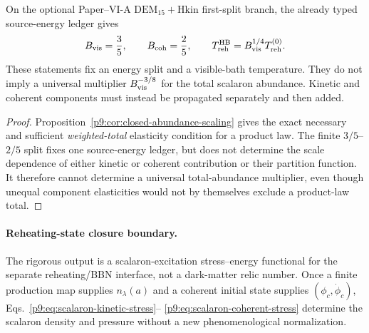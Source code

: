 \documentclass[12pt,a4paper]{article}
\begin{document}
\begin{proposition}
\label{p9:thm:scalaron-readout-coordinate-conversion}
On the optional Paper--VI-A \(\mathrm{DEM}_{15}+\mathrm{Hkin}\) first-split
branch, the already typed source-energy ledger gives
\[
B_{\rm vis}=\frac35,\qquad B_{\rm coh}=\frac25,
\qquad T_{\rm reh}^{\rm HB}=B_{\rm vis}^{1/4}T_{\rm reh}^{(0)}.
\]
These statements fix an energy split and a visible-bath temperature.  They do
not imply a universal multiplier \(B_{\rm vis}^{-3/8}\) for the total scalaron
abundance.  Kinetic and coherent components must instead be propagated
separately and then added.
\end{proposition}

\begin{proof}
Proposition~\ref{p9:cor:closed-abundance-scaling} gives the exact necessary
and sufficient \emph{weighted-total} elasticity condition for a product law.
The finite \(3/5\)--\(2/5\) split fixes one source-energy ledger, but does
not determine the scale dependence of either kinetic or coherent contribution
or their partition function.  It therefore cannot determine a universal
total-abundance multiplier, even though unequal component elasticities would
not by themselves exclude a product-law total.
\end{proof}




\paragraph{Reheating-state closure boundary.}
The rigorous output is a scalaron-excitation stress--energy functional for the
separate reheating/BBN interface, not a dark-matter relic number.  Once a finite
production map supplies \(n_\lambda(a)\) and a coherent initial state supplies
\((\phi_c,\dot\phi_c)\), Eqs.~\eqref{p9:eq:scalaron-kinetic-stress}--
\eqref{p9:eq:scalaron-coherent-stress} determine the scalaron density and
pressure without a new phenomenological normalization.

\end{document}
